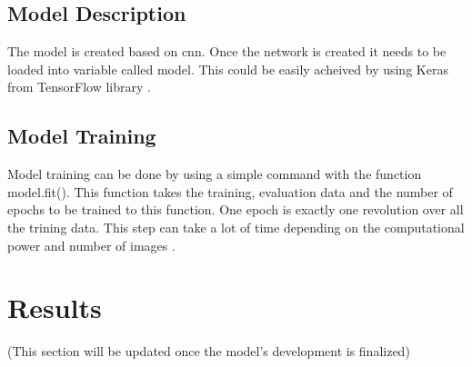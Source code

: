\subsection{Model Description}
The model is created based on \ac{cnn}. Once the network is created it needs to be loaded into variable called model. This could be easily acheived by using Keras from TensorFlow library \cite{Mueller:2022Part2}.

\subsection{Model Training}
Model training can be done by using a simple command with the function model.fit(). This function takes the training, evaluation data and the number of epochs to be trained to this function. One epoch is exactly one revolution over all the trining data. This step can take a lot of time depending on the computational power and number of images \cite{Mueller:2022Part2}.

\section{Results}
(This section will be updated once the model's development is finalized)







